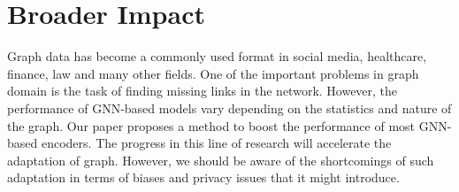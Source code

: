 \documentclass{article}
\begin{document}
\begin{table*}[h]
\caption{Dataset statistics. Homophily Ratios are taken from \citep{ma2021homophily}.}
\label{data_stats}
\vskip 0.15in
\begin{center}
\begin{small}
\begin{sc}
\end{sc}
\end{small}
\end{center}
\vskip -0.1in
\end{table*}


\section{Broader Impact}\label{broader_impact}

Graph data has become a commonly used format in social media, healthcare, finance, law and many other fields. One of the important problems in graph domain is the task of finding missing links in the network. However, the performance of GNN-based models vary depending on the statistics and nature of the graph. Our paper proposes a method to boost the performance of most GNN-based encoders. The progress in this line of research will accelerate the adaptation of graph. However, we should be aware of the shortcomings of such adaptation in terms of biases and privacy issues that it might introduce.
\end{document}
